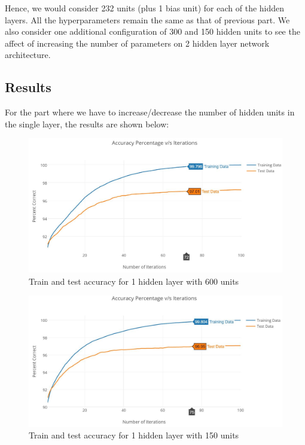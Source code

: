\documentclass{article}
\begin{document}
Hence, we would consider 232 units (plus 1 bias unit) for each of the hidden layers. All the hyperparameters remain the same as that of previous part. 
We also consider one additional configuration of 300 and 150 hidden units to see the affect of increasing the number of parameters on 2 hidden layer network architecture.

\subsection{Results}

For the part where we have to increase/decrease the number of hidden units in the single layer, the results are shown below:
\pagebreak
\begin{figure}[h!]
  \centering
  \includegraphics[width=117mm]{graphs/Q5a_600HU.JPG}
  \caption{Train and test accuracy for 1 hidden layer with 600 units}
  \label{fig:5a_1}
\end{figure}

\begin{figure}[h!]
  \centering
  \includegraphics[width=117mm]{graphs/Q5a_150HU.JPG}
  \caption{Train and test accuracy for 1 hidden layer with 150 units}
  \label{fig:5a_2}
\end{figure}
\end{document}
